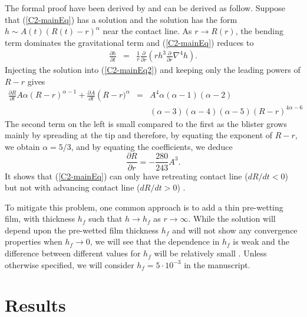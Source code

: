 The formal proof  have been derived by  \citet{Flitton:1999iv} and can
be derived  as follow. Suppose  that (\ref{C2-mainEq}) has  a solution
and the solution has the  form $h \sim A(t)(R(t)-r)^{\alpha}$ near the
contact line.  As $r \rightarrow R(r)$, the bending term dominates the
gravitational term and (\ref{C2-mainEq}) reduces to
\begin{eqnarray}
  \frac{\partial       h}{\partial       t}&      =&\frac{1}{       r}
                                                     \frac{\partial}{\partial r}\left( rh^3 \frac{\partial}{\partial r}\nabla^4h\right).
                                                     \label{C2-mainEq2}
\end{eqnarray}
Injecting the  solution into  (\ref{C2-mainEq2}) and keeping  only the
leading powers of $R-r$ gives
\begin{eqnarray}
  \frac{\partial    R}{\partial    t}    A\alpha\left(R-r\right)^{\alpha-1}+
  \frac{\partial           A}{\partial           t}\left(R-r)^{\alpha}
  &=&A^4\alpha(\alpha-1)(\alpha-2)\nonumber\\
  &&(\alpha-3)(\alpha-4)(\alpha-5)(R-r)^{4\alpha-6}\nonumber
\end{eqnarray}
The second  term on  the left is  small compared to  the first  as the
blister  grows  mainly by  spreading  at  the  tip and  therefore,  by
equating  the exponent  of $R-r$,  we obtain  $\alpha =  5/3$, and  by
equating the coefficients, we deduce
\begin{equation}
  \frac{\partial R}{\partial r} =-\frac{280}{243} A^3.
\end{equation}
It shows that (\ref{C2-mainEq}) can  only have retreating contact line
($dR/dt<0$)   but  not   with  advancing   contact  line   ($dR/dt>0$)
\citep{Lister:2013ia,Flitton:1999iv}.

To  mitigate this  problem,  one  common approach  is  to  add a  thin
pre-wetting film, with thickness $h_f$ such that $h\rightarrow h_f$ as
$r\rightarrow  \infty$.   While  the  solution will  depend  upon  the
pre-wetted  film thickness  $h_f$ and  will not  show any  convergence
properties when $h_f\rightarrow 0$, we will see that the dependence in
$h_f$ is  weak and the  difference between different values  for $h_f$
will  be  relatively  small  \citep{Lister:2013ia,Anonymous:QWXp_4JV}.
Unless otherwise specified, we will consider $h_f = 5\cdot 10^{-3}$ in
the manuscript.



\section{Results}
\label{C2-sec:regime-propagations}


